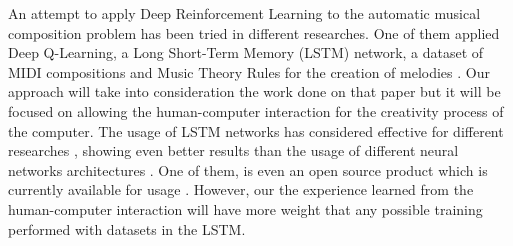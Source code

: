 An attempt to apply Deep Reinforcement Learning to the automatic musical composition problem has been tried in different researches. One of them applied Deep Q-Learning, a Long Short-Term Memory (LSTM) network, a dataset of MIDI compositions and Music Theory Rules for the creation of melodies \cite{deeprl2016music}. Our approach will take into consideration the work done on that paper but it will be focused on allowing the human-computer interaction for the creativity process of the computer. The usage of LSTM networks has considered effective for different researches \cite{deeprl2016music} \cite{eck2002blues}, showing even better results than the usage of different neural networks architectures \cite{briot2019survey}. One of them, is even an open source product which is currently available for usage \cite{magenta2018}. However, our the experience learned from the human-computer interaction will have more weight that any possible training performed with datasets in the LSTM.

